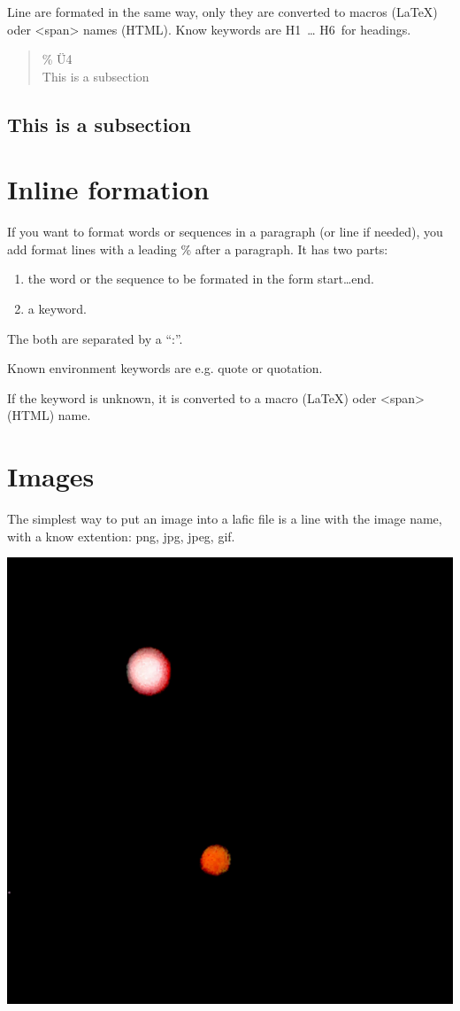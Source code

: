 \documentclass{scrartcl}
\begin{document}
Line are formated in the same way, only they are converted
to macros (LaTeX) oder <span> names (HTML). Know keywords
are H1~… H6~for headings.

\begin{quote}
    \% Ü4\\
    This is a subsection\\

\end{quote}

\subsection{This is a subsection}

\section{Inline formation}

If you want to format words or sequences in a paragraph (or
line if needed), you add format lines with a leading \% after
a paragraph. It has two parts:

\begin{enumerate}

\item the word or the sequence to be formated in the form
start…end. 
\item a keyword.

\end{enumerate}

The both are separated by a "`:"'.

Known environment keywords are e.g. quote or quotation.

If the keyword is unknown, it is converted to a macro
(LaTeX) oder <span> (HTML) name.

\section{Images}

The simplest way to put an image into a lafic file is a
line with the image name, with a know extention: png, jpg,
jpeg, gif.

\includegraphics[width=.50\linewidth]{Image.png}
\end{document}
